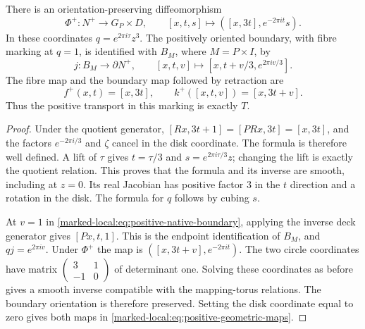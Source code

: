 \begin{theorem}\label{marked-local:thm:positive-geometry}
There is an orientation-preserving diffeomorphism
\begin{equation}\label{marked-local:eq:positive-product}
 \Phi^+:N^+\longrightarrow G_P\times D,
 \qquad [x,t,s]\longmapsto([x,3t],e^{-2\pi it}s).
\end{equation}
In these coordinates $q=e^{2\pi i\tau}z^3$.
The positively oriented boundary, with fibre marking at $q=1$,
is identified with $B_M$, where $M=P\times I$, by
\begin{equation}\label{marked-local:eq:positive-native-boundary}
 j:B_M\longrightarrow\partial N^+,
 \qquad [x,t,v]\longmapsto[x,t+v/3,e^{2\pi iv/3}].
\end{equation}
The fibre map and the boundary map followed by retraction are
\begin{equation}\label{marked-local:eq:positive-geometric-maps}
 f^+(x,t)=[x,3t],\qquad
 k^+([x,t,v])=[x,3t+v].
\end{equation}
Thus the positive transport in this marking is exactly $T$.
\end{theorem}
\begin{proof}
Under the quotient generator,
$[Rx,3t+1]=[PRx,3t]=[x,3t]$, and the factors
$e^{-2\pi i/3}$ and $\zeta$ cancel in the disk coordinate.
The formula is therefore well defined. A lift of $\tau$ gives
$t=\tau/3$ and $s=e^{2\pi i\tau/3}z$; changing the lift is exactly
the quotient relation. This proves that the formula and its inverse
are smooth, including at $z=0$. Its real Jacobian has positive
factor $3$ in the $t$ direction and a rotation in the disk.
The formula for $q$ follows by cubing $s$.

At $v=1$ in \eqref{marked-local:eq:positive-native-boundary}, applying the inverse
deck generator gives $[Px,t,1]$. This is the endpoint identification
of $B_M$, and $qj=e^{2\pi iv}$. Under $\Phi^+$ the map is
$([x,3t+v],e^{-2\pi it})$. The two circle coordinates have matrix
$\left(\begin{smallmatrix}3&1\\-1&0\end{smallmatrix}\right)$
of determinant one. Solving these coordinates as before gives a
smooth inverse compatible with the mapping-torus relations.
The boundary orientation is therefore preserved. Setting the disk
coordinate equal to zero gives both maps in
\eqref{marked-local:eq:positive-geometric-maps}.
\end{proof}

